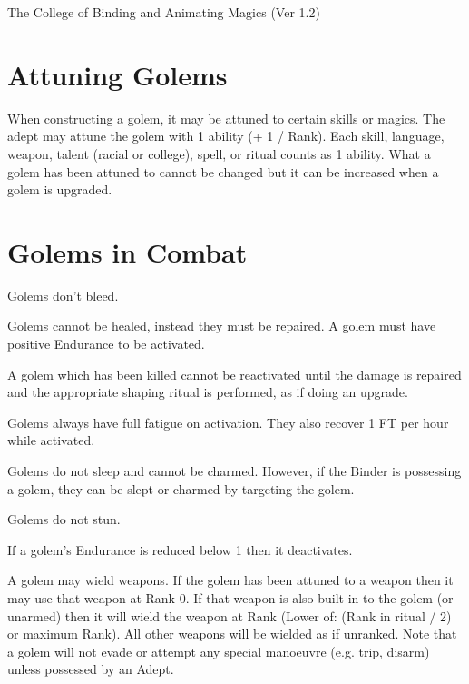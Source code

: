 \begin{Chapter}{The College of Binding and Animating Magics (Ver 1.2)}
\section{Attuning Golems}

When constructing a golem, it may be attuned to certain skills or
magics.  The adept may attune the golem with 1 ability (+ 1 / Rank).
Each skill, language, weapon, talent (racial or college), spell, or
ritual counts as 1 ability.  What a golem has been attuned to cannot
be changed but it can be increased when a golem is upgraded.


\section{Golems in Combat}

\begin{Description}

\item[Bleeding] Golems don’t bleed. 

\item[Damaged Golems] Golems cannot be healed, instead they must be
  repaired.  A golem must have positive Endurance to be activated.

\item[Dead Golems] A golem which has been killed cannot be reactivated
  until the damage is repaired and the appropriate shaping ritual is
  performed, as if doing an upgrade.

\item[Fatigue Recovery] Golems always have full fatigue on activation.
  They also recover 1 FT per hour while activated.

\item[Sleep and Charm] Golems do not sleep and cannot be charmed.
  However, if the Binder is possessing a golem, they can be slept or
  charmed by targeting the golem.

\item[Stun] Golems do not stun.

\item[Unconsciousness] If a golem’s Endurance is reduced below 1 then
  it deactivates.

\item[Weapon Ranks] A golem may wield weapons.  If the golem has been
  attuned to a weapon then it may use that weapon at Rank 0.  If that
  weapon is also built-in to the golem (or unarmed) then it will wield
  the weapon at Rank (Lower of: (Rank in ritual / 2) or maximum Rank).
  All other weapons will be wielded as if unranked.  Note that a golem
  will not evade or attempt any special manoeuvre (e.g. trip, disarm)
  unless possessed by an Adept.


\end{Description}
\end{Chapter}
